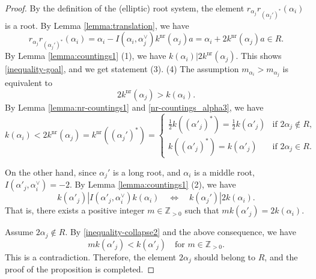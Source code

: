 \documentclass[11pt]{amsart}
\newcommand{\Z}{\mathbb{Z}}
\newcommand{\nr}{\mathrm{nr}}
\begin{document}
{\begin{proof}
By the definition of the (elliptic) root system, the element 
$r_{\alpha_j}r_{(\alpha_j')^\ast}(\alpha_i)$ is a root.  
By Lemma \ref{lemma:translation}, we have
\[r_{\alpha_j}r_{(\alpha_j')^\ast}(\alpha_i)
=\alpha_i-I(\alpha_i,\alpha_j^\vee)k^\nr(\alpha_j)a=\alpha_i+2k^\nr(\alpha_j)a\in R.\]
By Lemma \ref{lemma:countings1} (1), we have 
$k(\alpha_i)|2k^\nr(\alpha_j)$.
This shows \eqref{inequality-goal}, and we get statement (3).
\vskip 1mm
\noindent
(4) The assumption $m_{\alpha_i}>m_{\alpha_j}$ is equivalent to
\begin{equation*}\label{inequality-collapse1}
2k^\nr(\alpha_j)> k(\alpha_i).
\end{equation*} 
By Lemma \ref{lemma:nr-countings1} and \eqref{nr-countings_alpha3}, we have
\begin{equation}\label{inequality-collapse2}
k(\alpha_i)<2k^\nr(\alpha_j)=k^\nr((\alpha_j')^\ast)=
\begin{cases}
\frac12 k((\alpha'_j)^\ast)=\frac12 k(\alpha'_j) & \text{if $2\alpha_j\not\in R$},\\
k((\alpha'_j)^\ast)=k(\alpha'_j) & \text{if $2\alpha_j\in R$}.
\end{cases}
\end{equation}

On the other hand, since $\alpha_j'$ is a long root, and $\alpha_i$ is a middle
root, $I(\alpha'_j,\alpha_i^\vee)=-2$. 
By Lemma \ref{lemma:countings1} (2), we have
\[k(\alpha'_j)|I(\alpha'_j,\alpha_i^\vee)k(\alpha_i)\quad\Longleftrightarrow\quad
k(\alpha_j')|2k(\alpha_i).\]
That is, there exists  a positive integer $m\in\Z_{>0}$ such that 
$m k(\alpha'_j)=2 k(\alpha_i)$. 

Assume $2\alpha_j\not\in R$. By \eqref{inequality-collapse2} and
the above consequence, we have 
\[mk(\alpha'_j)<k(\alpha'_j)\quad \text{for $m\in \Z_{>0}$}.\]
This is a contradiction. Therefore, the element $2\alpha_j$ should belong to $R$, 
and the proof of the proposition is completed.
\end{proof}

}
\end{document}

